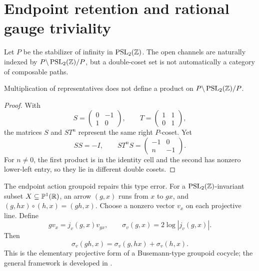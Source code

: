 \section{Endpoint retention and rational gauge triviality}

Let \(P\) be the stabilizer of infinity in \(\operatorname{PSL}_2(\mathbb{Z})\).  The open channels
are naturally indexed by \(P\backslash\operatorname{PSL}_2(\mathbb{Z})/P\), but a double-coset set is
not automatically a category of composable paths.

\begin{proposition}
Multiplication of representatives does not define a product on
\(P\backslash\operatorname{PSL}_2(\mathbb{Z})/P\).
\end{proposition}

\begin{proof}
With
\[
S=\begin{pmatrix}0&-1\\1&0\end{pmatrix},\qquad
T=\begin{pmatrix}1&1\\0&1\end{pmatrix},
\]
the matrices \(S\) and \(ST^n\) represent the same right \(P\)-coset.  Yet
\[
SS=-I,\qquad
ST^nS=\begin{pmatrix}-1&0\\n&-1\end{pmatrix}.
\]
For \(n\ne0\), the first product is in the identity cell and the second has
nonzero lower-left entry, so they lie in different double cosets.
\end{proof}

The endpoint action groupoid repairs this type error.  For a
\(\operatorname{PSL}_2(\mathbb{Z})\)-invariant subset \(X\subseteq\mathbb P^1(\mathbb{R})\), an arrow
\((g,x)\) runs from \(x\) to \(gx\), and
\((g,hx)\circ(h,x)=(gh,x)\).  Choose a nonzero vector \(v_x\) on each
projective line.  Define
\begin{equation}
g v_x=j_v(g,x)v_{gx},\qquad
\sigma_v(g,x)=2\log|j_v(g,x)|.
\label{eq:automorphy-cocycle}
\end{equation}
Then
\begin{equation}
\sigma_v(gh,x)=\sigma_v(g,hx)+\sigma_v(h,x).
\label{eq:cocycle-law}
\end{equation}
This is the elementary projective form of a Busemann-type groupoid cocycle;
the general framework is developed in \cite{Nekrashevych2014}.


